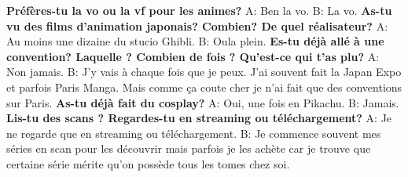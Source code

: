 \textbf{Préfères-tu la vo ou la vf pour les animes?}
\newline
A: Ben la vo.
\newline
B: La vo.
\newline
\textbf{As-tu vu des films d'animation japonais? Combien? De quel réalisateur?}
\newline
A: Au moins une dizaine du stucio Ghibli.
\newline
B: Oula plein.
\newline
\textbf{Es-tu déjà allé à une convention? Laquelle ? Combien de fois ? Qu'est-ce qui t'as plu?}
\newline
A: Non jamais.
\newline
B: J'y vais à chaque fois que je peux. J'ai souvent fait la Japan Expo et parfois Paris Manga. Mais comme ça coute cher je n'ai fait que des conventions sur Paris.
\newline
\textbf{As-tu déjà fait du cosplay?}
\newline
A: Oui, une fois en Pikachu.
\newline
B: Jamais.
\newline
\textbf{Lis-tu des scans ? Regardes-tu en streaming ou téléchargement?}
\newline
A: Je ne regarde que en streaming ou téléchargement.
\newline
B: Je commence souvent mes séries en scan pour les découvrir mais parfois je les achète car je trouve que certaine série mérite qu'on possède tous les tomes chez soi.
